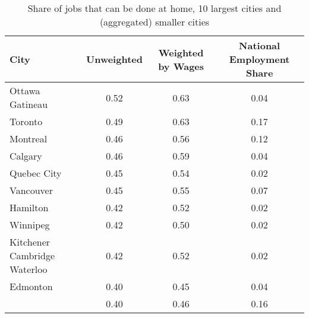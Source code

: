 \begin{table}[ht]
\centering
\caption{Share of jobs that can be done at home, 10 largest cities and (aggregated) smaller cities} 
\label{tab:table_cities_largest}
\begin{tabular}{lccc}
  \hline
City & Unweighted & Weighted by Wages & National Employment Share \\ 
  \hline
Ottawa   Gatineau & 0.52 & 0.63 & 0.04 \\ 
  Toronto & 0.49 & 0.63 & 0.17 \\ 
  Montreal & 0.46 & 0.56 & 0.12 \\ 
  Calgary & 0.46 & 0.59 & 0.04 \\ 
  Quebec City & 0.45 & 0.54 & 0.02 \\ 
  Vancouver & 0.45 & 0.55 & 0.07 \\ 
  Hamilton & 0.42 & 0.52 & 0.02 \\ 
  Winnipeg & 0.42 & 0.50 & 0.02 \\ 
  Kitchener   Cambridge   Waterloo & 0.42 & 0.52 & 0.02 \\ 
  Edmonton & 0.40 & 0.45 & 0.04 \\ 
   & 0.40 & 0.46 & 0.16 \\ 
   \hline
\end{tabular}
\end{table}
